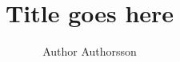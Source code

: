 \documentclass{article}
\begin{document}
\title{Title goes here}
\author{Author Authorsson}

\maketitle

\end{document}
